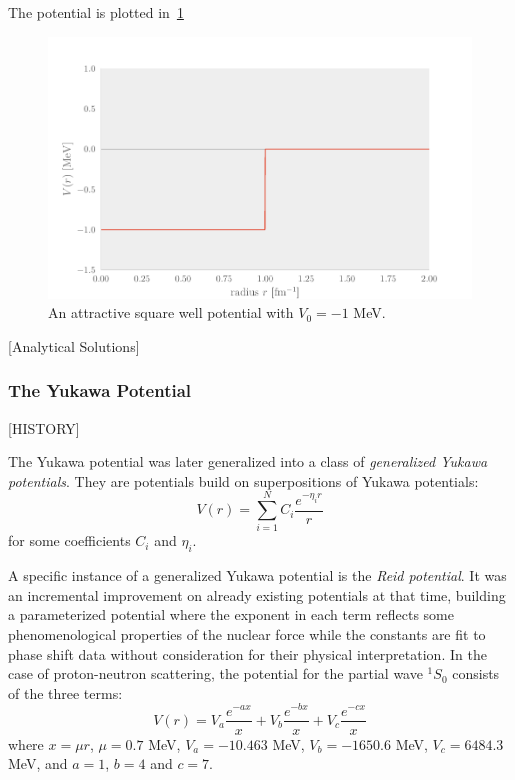 The potential is plotted in~\cref{fig:squarewell}

\begin{figure}[H]
  \centering
  \includegraphics[]{Figures/squarewell.pdf}
  \caption{\label{fig:squarewell} An attractive square well potential with
    \(V_{0}=-1\) MeV.}
\end{figure}

[Analytical Solutions]


\subsubsection{The Yukawa Potential}
[HISTORY]

The Yukawa potential was later generalized into a class of \textit{generalized
  Yukawa potentials}. They are potentials build on superpositions of Yukawa potentials:
\begin{equation*}
  V(r) = \sum_{i=1}^{N}C_{i}\frac{e^{-\eta_{i}r}}{r}
\end{equation*}
for some coefficients \(C_{i}\) and \(\eta_{i}\).

A specific instance of a generalized Yukawa potential is the \textit{Reid
  potential}\cite{reid}. It was an incremental improvement on already existing potentials
at that time, building a parameterized potential where the exponent in each term reflects some
phenomenological properties of the nuclear force while the constants are fit to
phase shift data without consideration for their physical interpretation.
In the case of proton-neutron scattering, the potential for the partial wave
\(^{1}S_{0}\) consists of the three terms:
\begin{equation*}
  V(r) = V_{a}\frac{e^{-ax}}{x} + V_{b}\frac{e^{-bx}}{x} + V_{c}\frac{e^{-cx}}{x}
\end{equation*}
where \(x=\mu r\), \(\mu=0.7\) MeV, \(V_{a}=-10.463\) MeV, \(V_{b}=-1650.6\)
MeV, \(V_{c}=6484.3\) MeV, and \(a=1\), \(b=4\) and \(c=7\).

